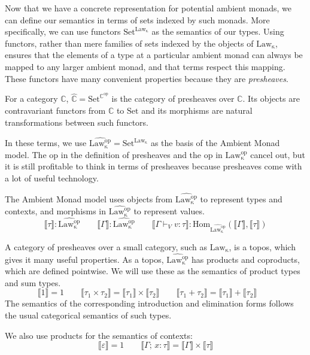 \documentclass[acmsmall, screen, review, anonymous]{acmart}
\theoremstyle{definition}
\newcommand{\cat}{\mathbb{C}}
\newcommand{\op}{\mathrm{op}}
\newcommand{\catop}{\cat^{\op}}
\newcommand{\setc}{\mathrm{Set}}
\newcommand{\psh}{\widehat{\cat}}
\newcommand{\lawc}{\mathrm{Law_{\kappa}}}
\newcommand{\lawcop}{\mathrm{Law_{\kappa}^{op}}}
\newcommand{\pshlawcop}{\widehat{\lawcop}}
\newcommand{\homset}[3]{\mathrm{Hom}_{#1}(#2, #3)}
\newcommand{\sem}[1]{\llbracket #1 \rrbracket}
\newcommand{\types}{\mathrel{:}}
\newcommand{\cempty}{\varepsilon}
\newcommand{\ccons}[2]{#1;\,#2}
\newcommand{\lbind}[3]{\ccons{#1}{#2\types#3}}
\newcommand{\turnv}{\mathrel{\vdash_V}}
\begin{document}
Now that we have a concrete representation for potential ambient monads,
we can define our semantics in terms of sets indexed by such
monads. More specifically, we can use functors $\setc^{\lawc}$ as the
semantics of our types. Using functors, rather than mere families of
sets indexed by the objects of $\lawc$, ensures that the elements of a
type at a particular ambient monad can always be mapped to any larger
ambient monad, and that terms respect this mapping. These functors have many
convenient properties because they are \emph{presheaves}.

For a category $\cat$, $\psh = \setc^{\catop}$ is the category of
presheaves over $\cat$. Its objects are contravariant functors from
$\cat$ to $\setc$ and its morphisms are natural transformations between
such functors.

In these terms, we use $\pshlawcop = \setc^{\lawc}$ as the basis of the
Ambient Monad model. The $\op$ in the definition of
presheaves and the $\op$ in $\lawcop$ cancel out, but it is still
profitable to think in terms of presheaves because presheaves come with
a lot of useful technology.

The Ambient Monad model uses objects from $\pshlawcop$ to represent
types and contexts, and morphisms in $\pshlawcop$ to represent
values.
\begin{equation*}
\sem{\tau} \mathrel{:} \pshlawcop \qquad
\sem{\Gamma} \mathrel{:} \pshlawcop \qquad
\sem{\Gamma \turnv v \types \tau} \mathrel{:} \homset{\pshlawcop}{\sem{\Gamma}}{\sem{\tau}}
\end{equation*}

A category of presheaves over a small category, such as $\lawc$, is a
topos, which gives it many useful properties. As a topos, $\pshlawcop$
has products and coproducts, which are defined pointwise. We will use
these as the semantics of product types and sum types.
\begin{equation*}
\sem{1} = 1 \qquad
\sem{\tau_1 \times \tau_2} = \sem{\tau_1} \times \sem{\tau_2} \qquad
\sem{\tau_1 + \tau_2} = \sem{\tau_1} + \sem{\tau_2} \qquad
\end{equation*}
The semantics of the corresponding introduction and elimination forms
follows the usual categorical semantics of such types.

We also use products for the semantics of contexts:
\begin{equation*}
\sem{\cempty} = 1 \qquad
\sem{\lbind{\Gamma}{x}{\tau}} = \sem{\Gamma} \times \sem{\tau}
\end{equation*}
\end{document}
